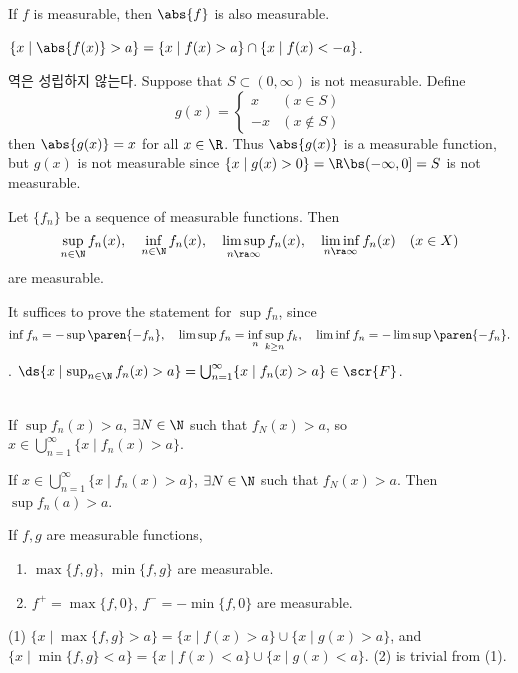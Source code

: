  If \(f\) is measurable, then \(\abs{f}\) is also measurable.

\pf \(\{x \mid \abs{f(x)} > a\} = \{x \mid f(x) > a\} \cap \{x \mid f(x) < -a\}\).

\rmk 역은 성립하지 않는다. Suppose that \(S \subset (0, \infty)\) is not measurable. Define
\[
    g(x) = \begin{cases}
        x & (x \in S) \\ -x & (x \notin S)
    \end{cases}
\]
then \(\abs{g(x)} = x\) for all \(x \in \R\). Thus \(\abs{g(x)}\) is a measurable function, but \(g(x)\) is not measurable since \(\{x \mid g(x) > 0\} = \R \bs (-\infty, 0] = S\) is not measurable.

\medskip

 Let \(\{f_n\}\) be a sequence of measurable functions. Then
\[
    \sup_{n\in \N} f_n(x), \quad \inf_{n\in \N} f_n(x), \quad \limsup_{n \ra \infty} f_n(x), \quad \liminf_{n \ra \infty} f_n(x) \quad (x\in X)
\]
are measurable.

\pf It suffices to prove the statement for \(\sup f_n\), since
\[
    \inf f_n = -\sup\paren{-f_n}, \quad \limsup f_n = \inf_n \sup_{k\geq n} f_k, \quad \liminf f_n = -\limsup\paren{-f_n}.
\]
\quad \claim. \(\ds \{x \mid \sup_{n\in\N} f_n(x) > a\} =  \bigcup_{n=1}^{\infty} \{x \mid f_n(x) > a\} \in \scr{F}\).

\quad \pf \\
\note{\(\subset\)} If \(\sup f_n(x) > a\), \(\exists N \in \N\) such that \(f_N(x) > a\), so \(x \in \bigcup_{n=1}^{\infty} \{x \mid f_n(x) > a\}\).

\note{\(\supseteq\)} If \(x \in \bigcup_{n=1}^{\infty} \{x \mid f_n(x) > a\}\), \(\exists N \in \N\) such that \(f_N(x) > a\). Then \(\sup f_n(a) > a\).

\medskip

\cor If \(f, g\) are measurable functions,
\begin{enumerate}
    \item \(\max\{f, g\}\), \(\min\{f, g\}\) are measurable.
    \item \(f^+ = \max\{f, 0\}\), \(f^- = -\min\{f, 0\}\) are measurable.
\end{enumerate}

\pf (1) \(\{x \mid \max\{f, g\} > a\} = \{x \mid f(x) > a\} \cup \{x \mid g(x) > a\}\), and \(\{x \mid \min\{f, g\} < a\} = \{x \mid f(x) < a\} \cup \{x \mid g(x) < a\}\). (2) is trivial from (1).

\medskip

